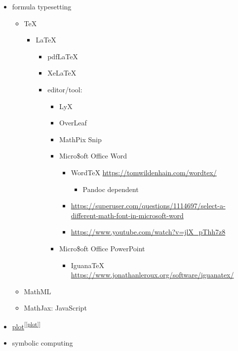 \documentclass[
]{book}
\providecommand{\tightlist}{%
  \setlength{\itemsep}{0pt}\setlength{\parskip}{0pt}}
\theoremstyle{definition}
\theoremstyle{definition}
\theoremstyle{definition}
\theoremstyle{definition}
\theoremstyle{remark}
\begin{document}
\begin{itemize}
\tightlist
\item
  formula typesetting

  \begin{itemize}
  \tightlist
  \item
    TeX

    \begin{itemize}
    \tightlist
    \item
      LaTeX

      \begin{itemize}
      \tightlist
      \item
        pdfLaTeX
      \item
        XeLaTeX
      \item
        editor/tool:

        \begin{itemize}
        \tightlist
        \item
          LyX
        \item
          OverLeaf
        \item
          MathPix Snip
        \item
          Micro\$oft Office Word

          \begin{itemize}
          \tightlist
          \item
            WordTeX \url{https://tomwildenhain.com/wordtex/}

            \begin{itemize}
            \tightlist
            \item
              Pandoc dependent
            \end{itemize}
          \item
            \url{https://superuser.com/questions/1114697/select-a-different-math-font-in-microsoft-word}
          \item
            \url{https://www.youtube.com/watch?v=jlX_pThh7z8}
          \end{itemize}
        \item
          Micro\$oft Office PowerPoint

          \begin{itemize}
          \tightlist
          \item
            IguanaTeX \url{https://www.jonathanleroux.org/software/iguanatex/}
          \end{itemize}
        \end{itemize}
      \end{itemize}
    \end{itemize}
  \item
    MathML
  \item
    MathJax: JavaScript
  \end{itemize}
\item
  \hyperref[plot]{plot}\textsuperscript{{[}\ref{plot}{]}}
\item
  symbolic computing


\end{itemize}
\end{document}
